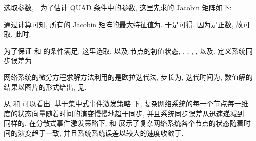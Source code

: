     选取参数, . 为了估计 QUAD 条件中的参数, 这里先求的 Jacobin 矩阵如下:
        \begin{comment}
        J_1=\left(
              \begin{array}{ccc}
                3.0318 & 9.78 & 0 \\
                1 & -1 & 1 \\
                0 & -14.97 & 0 \\
              \end{array}
            \right),
        J_2=\left(
              \begin{array}{ccc}
                -2.445 & 9.78 & 0 \\
                1 & -1 & 1 \\
                0 & -14.97 & 0 \\
              \end{array}
            \right).
        \end{comment}
        通过计算可知, 所有的 Jacobin 矩阵的最大特征值为. 于是可得. 因为是正数, 故可取, 此时.

    为了保证 和 的条件满足, 这里选取, 以及.节点的初值状态, , , , , 以及.
    定义系统同步误差为


    网络系统的微分方程求解方法利用的是欧拉迭代法, 步长为, 迭代时间为, 数值解的结果以图片的形式给出, 见.

    从 和 可以看出, 基于集中式事件激发策略  下, 复杂网络系统的每一个节点每一维度的状态向量随着时间的演变慢慢地趋于同步, 并且系统同步误差从迅速递减到. 同样的, 在分散式事件激发策略下,  和 展示了复杂网络系统各个节点的状态随着时间的演变趋于一致, 并且系统系统误差以较大的速度收敛于.
    \begin{comment}[!htb]
\begin{minipage}[t]{0.48\linewidth}\centering
\texttt{[image: noise/gct.eps]}\caption{在分散式激发策略  下, 系统总测量误差图.}\label{gt}
\end{minipage}~~
\begin{minipage}[t]{0.48\linewidth}\centering
\texttt{[image: noise/git.eps]}\caption{在分散式激发策略  下, 各个节点的策略误差图.}\label{degt}
\end{minipage}
\end{comment}
\begin{comment}[!htb]
\begin{minipage}[t]{0.48\linewidth}\centering
\texttt{[image: noise/trigger.eps]}\caption{在集中式激发策略  和分散式激发策略 下, 节点激发次数对比图.}\label{tritimes}
\end{minipage}
\end{comment}

